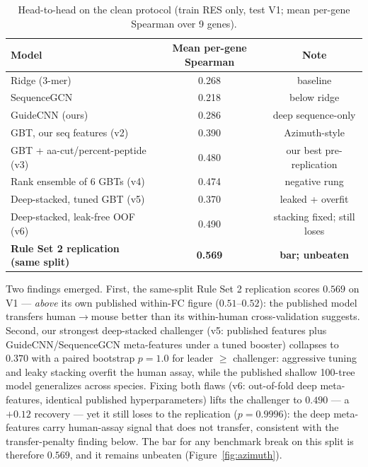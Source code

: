 \documentclass[12pt]{article}
\begin{document}
\begin{table}[h]\centering
\caption{Head-to-head on the clean protocol (train RES only, test V1;
mean per-gene Spearman over 9 genes).}\label{tab:azimuth}
\begin{tabular}{lcc}\hline\hline
Model & Mean per-gene Spearman & Note \\\hline
Ridge (3-mer) & 0.268 & baseline \\
SequenceGCN & 0.218 & below ridge \\
GuideCNN (ours) & 0.286 & deep sequence-only \\
GBT, our seq features (v2) & 0.390 & Azimuth-style \\
GBT + aa-cut/percent-peptide (v3) & 0.480 & our best pre-replication \\
Rank ensemble of 6 GBTs (v4) & 0.474 & negative rung \\
Deep-stacked, tuned GBT (v5) & 0.370 & leaked + overfit \\
Deep-stacked, leak-free OOF (v6) & 0.490 & stacking fixed; still loses \\
\textbf{Rule Set 2 replication (same split)} & \textbf{0.569} & \textbf{bar; unbeaten} \\\hline\hline
\end{tabular}
\end{table}

Two findings emerged. First, the same-split Rule Set 2 replication scores
$0.569$ on V1 --- \emph{above} its own published within-FC figure
($0.51$--$0.52$): the published model transfers human$\to$mouse better
than its within-human cross-validation suggests. Second, our strongest
deep-stacked challenger (v5: published features plus GuideCNN/SequenceGCN
meta-features under a tuned booster) collapses to $0.370$ with a paired
bootstrap $p = 1.0$ for leader $\geq$ challenger: aggressive tuning and
leaky stacking overfit the human assay, while the published shallow
100-tree model generalizes across species. Fixing both flaws (v6:
out-of-fold deep meta-features, identical published hyperparameters) lifts
the challenger to $0.490$ --- a $+0.12$ recovery --- yet it still loses to
the replication ($p = 0.9996$): the deep meta-features carry human-assay
signal that does not transfer, consistent with the transfer-penalty finding
below. The bar for any benchmark break on this split is therefore $0.569$,
and it remains unbeaten
(Figure~\ref{fig:azimuth}).
\end{document}
